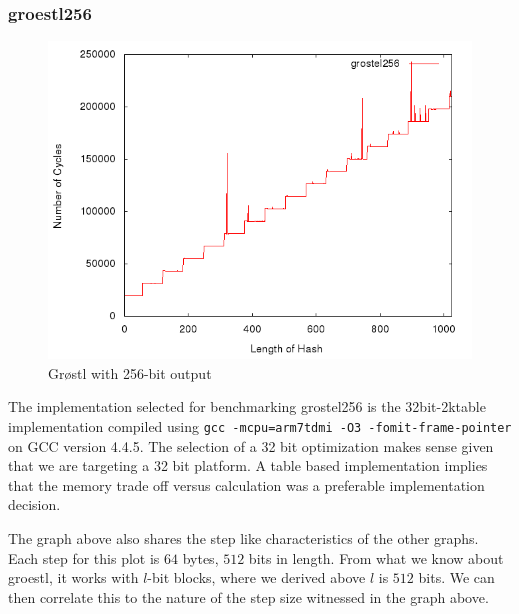 \documentclass[10pt,a4paper]{article}
\begin{document}
\subsubsection{groestl256}
    \begin{figure}[H]
        \begin{center}
            \includegraphics[scale=0.5]{images/grostel256.png} 
            \caption{Gr{\o}stl with 256-bit output}
        \end{center}
    \end{figure}

The implementation selected for benchmarking grostel256 is the 32bit-2ktable
implementation compiled using \texttt{gcc -mcpu=arm7tdmi -O3
-fomit-frame-pointer} on GCC version 4.4.5. The selection of a 32 bit
optimization makes sense given that we are targeting a 32 bit platform. A table
based implementation implies that the memory trade off versus calculation was a
preferable implementation decision.

The graph above also shares the step like characteristics of the other graphs.
Each step for this plot is $64$ bytes, $512$ bits in length. From what we know
about groestl, it works with $l$-bit blocks, where we derived above $l$ is $512$
bits. We can then correlate this to the nature of the step size witnessed in the
graph above.
\end{document}
